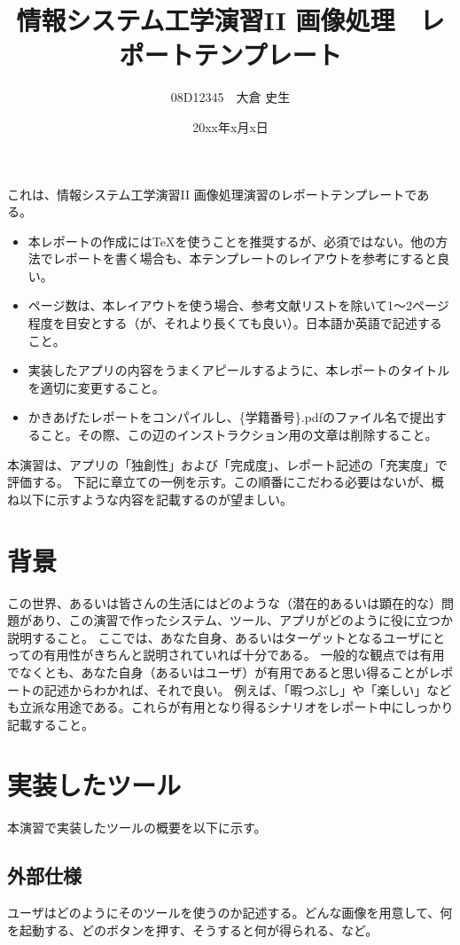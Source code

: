 \documentclass[twocolumn, a4paper]{jsarticle}
\begin{document}
\title{情報システム工学演習II 画像処理　レポートテンプレート}
\author{08D12345　大倉 史生}
\date{20xx年x月x日} 
\twocolumn[
\maketitle
]

これは、情報システム工学演習II 画像処理演習のレポートテンプレートである。
\begin{itemize}
\item 本レポートの作成には\TeX を使うことを推奨するが、必須ではない。他の方法でレポートを書く場合も、本テンプレートのレイアウトを参考にすると良い。
\item ページ数は、本レイアウトを使う場合、参考文献リストを除いて1～2ページ程度を目安とする（が、それより長くても良い）。日本語か英語で記述すること。
\item 実装したアプリの内容をうまくアピールするように、本レポートのタイトルを適切に変更すること。
\item かきあげたレポートをコンパイルし、\{学籍番号\}.pdfのファイル名で提出すること。その際、この辺のインストラクション用の文章は削除すること。
\end{itemize}
本演習は、アプリの「独創性」および「完成度」、レポート記述の「充実度」で評価する。
下記に章立ての一例を示す。この順番にこだわる必要はないが、概ね以下に示すような内容を記載するのが望ましい。

\section{背景}
この世界、あるいは皆さんの生活にはどのような（潜在的あるいは顕在的な）問題があり、この演習で作ったシステム、ツール、アプリがどのように役に立つか説明すること。
ここでは、あなた自身、あるいはターゲットとなるユーザにとっての有用性がきちんと説明されていれば十分である。
一般的な観点では有用でなくとも、あなた自身（あるいはユーザ）が有用であると思い得ることがレポートの記述からわかれば、それで良い。
例えば、「暇つぶし」や「楽しい」なども立派な用途である。これらが有用となり得るシナリオをレポート中にしっかり記載すること。

\section{実装したツール}
本演習で実装したツールの概要を以下に示す。

\subsection{外部仕様}
ユーザはどのようにそのツールを使うのか記述する。どんな画像を用意して、何を起動する、どのボタンを押す、そうすると何が得られる、など。
\end{document}
